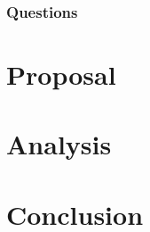 \documentclass{article}
\begin{document}
\subsubsection{Questions}

\section{Proposal}

\section{Analysis}

\section{Conclusion}



\end{document}
